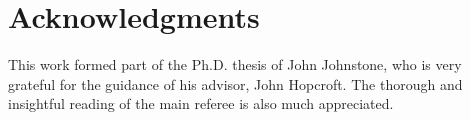 
\section*{Acknowledgments}
This work formed part of the Ph.D. thesis of John Johnstone, who is very 
grateful for
the guidance of his advisor, John Hopcroft.
The thorough and insightful reading of the main referee is also much 
appreciated.
%

\nocite{baj}
\nocite{law}





